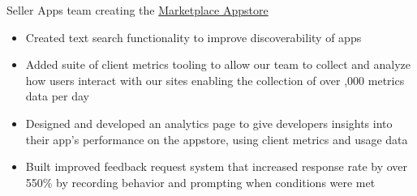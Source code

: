 \documentclass[11pt,letterpaper,ragged2e,withhyper]{altacv}
\newif\ifbubbles
\begin{document}
\begin{paracol}{2}








\switchcolumn


\par Seller Apps team creating the \href{https://sellercentral.amazon.com/apps/store}{\color{accent} Marketplace Appstore}
\begin{itemize}
    \item Created text search functionality to improve discoverability of apps
    \item Added suite of client metrics tooling to allow our team to collect and \linebreak analyze how users interact with our sites enabling the collection of over ,000 metrics data per day
    \item Designed and developed an analytics page to give developers insights into their app's performance on the appstore, using client metrics and usage data
    \item Built improved feedback request system that increased response rate by over 550\% by recording behavior and prompting when conditions were met
\end{itemize}

\ifbubbles
    \cvtag{TypeScript}
    \cvtag{Java}
    \cvtag{React}
    \cvtag{Redux}
    \cvtag{AWS}
    \cvtag{Jest}
    \cvtag{Enzyme}
    \cvtag{REST}
\fi


\end{paracol}
\end{document}
